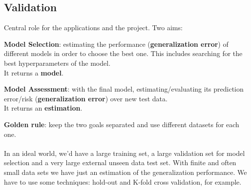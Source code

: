 \documentclass[10pt]{report}
\begin{document}
\subsection{Validation} Central role for the applications and the project. Two aims:
\begin{list}{}{}
	\item \textbf{Model Selection}: estimating the performance (\textbf{generalization error}) of different models in order to choose the best one. This includes searching for the best hyperparameters of the model.\\
	It returns a \textbf{model}.
	\item \textbf{Model Assessment}: with the final model, estimating/evaluating its prediction error/risk (\textbf{generalization error}) over new test data.\\
	It returns an \textbf{estimation}.
\end{list}
\textbf{Golden rule}: keep the two goals separated and use different datasets for each one.\\\\
In an ideal world, we'd have a large training set, a large validation set for model selection and a very large external unseen data test set. With finite and often small data sets we have just an estimation of the generalization performance. We have to use some techniques: hold-out and K-fold cross validation, for example.
\end{document}
